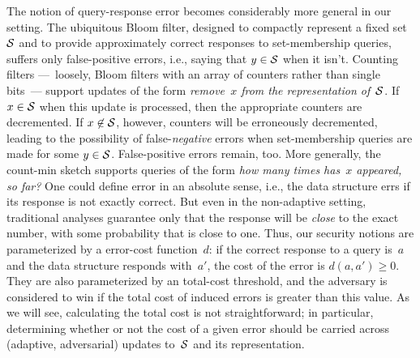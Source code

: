The notion of query-response error becomes considerably more
general in our setting.   The ubiquitous Bloom filter, designed to
compactly represent a fixed set~$\mathcal{S}$ and to provide approximately
correct responses to set-membership queries, suffers only
false-positive errors, i.e., saying that $y \in \mathcal{S}$ when it isn't.
Counting filters ---~loosely, Bloom filters
with an array of counters rather than single bits~--- support updates
of the form \emph{remove~$x$ from the representation of~$\mathcal{S}$}.  If
$x \in \mathcal{S}$ when this update is processed, then the appropriate
counters are decremented.  If $x \not\in \mathcal{S}$, however, counters will
be erroneously decremented, leading to the possibility of
false-\emph{negative} errors when set-membership queries are made for some $y
\in \mathcal{S}$.  False-positive errors remain, too.
More generally, the count-min sketch supports queries of the
form \emph{how many times has~$x$ appeared, so far?}  One could define
error in an absolute sense, i.e., the data structure errs if its
response is not exactly correct.  But even in the non-adaptive
setting, traditional analyses guarantee only that the response will be
\emph{close} to the exact number, with some probability that is close
to one.  Thus, our security notions are parameterized by a
error-cost function~$d$: if the correct response to a query is~$a$ and
the data structure responds with~$a'$, the cost of the error is
$d(a,a') \geq 0$.  
%
They are also parameterized by an total-cost threshold, and
the adversary is considered to win if the total cost of induced
errors is greater than this value.  As we will see, calculating the
total cost is not straightforward; in particular, determining whether
or not the cost of a given error should be carried across (adaptive,
adversarial) updates to~$\mathcal{S}$ and its representation.



